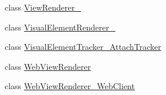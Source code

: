 \begin{CompactItemize}
class \hyperlink{classmd5b60ffeb829f638581ab2bb9b1a7f4f3f_1_1_view_renderer__2}{ViewRenderer\_}
\item 
class \hyperlink{classmd5b60ffeb829f638581ab2bb9b1a7f4f3f_1_1_visual_element_renderer__1}{VisualElementRenderer\_}
\item 
class \hyperlink{classmd5b60ffeb829f638581ab2bb9b1a7f4f3f_1_1_visual_element_tracker___attach_tracker}{VisualElementTracker\_\-AttachTracker}
\item 
class \hyperlink{classmd5b60ffeb829f638581ab2bb9b1a7f4f3f_1_1_web_view_renderer}{WebViewRenderer}
\item 
class \hyperlink{classmd5b60ffeb829f638581ab2bb9b1a7f4f3f_1_1_web_view_renderer___web_client}{WebViewRenderer\_\-WebClient}
\end{CompactItemize}

